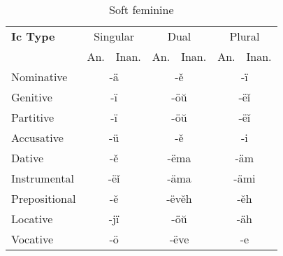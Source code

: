 \begin{table}[!htb]
	\caption{Soft feminine}
	\begin{tabular}{lllllll}
		\textbf{Ic Type}       
		& \multicolumn{2}{c}{Singular} 
		& \multicolumn{2}{c}{Dual} 
		& \multicolumn{2}{c}{Plural} \\
		& An.   & Inan.  & An.   & Inan.   & An.  & Inan. \\
		Nominative    & \multicolumn{2}{c}{-ä}      
		& \multicolumn{2}{c}{-ě}        
		& \multicolumn{2}{c}{-ï} \\
		Genitive      & \multicolumn{2}{c}{-ï}       
		& \multicolumn{2}{c}{-öŭ}      
		& \multicolumn{2}{c}{-ëǐ}   \\
		Partitive     & \multicolumn{2}{c}{-ï}       
		& \multicolumn{2}{c}{-öŭ}      
		& \multicolumn{2}{c}{-ëǐ} \\
		Accusative    & \multicolumn{2}{c}{-ü}       
		& \multicolumn{2}{c}{-ě}
		& \multicolumn{2}{c}{-i} \\
		Dative        & \multicolumn{2}{c}{-ě}       
		& \multicolumn{2}{c}{-ëma}     
		& \multicolumn{2}{c}{-äm} \\
		Instrumental  & \multicolumn{2}{c}{-ëǐ}     
		& \multicolumn{2}{c}{-äma}     
		& \multicolumn{2}{c}{-ämi} \\
		Prepositional & \multicolumn{2}{c}{-ě}       
		& \multicolumn{2}{c}{-ëvěh}     
		& \multicolumn{2}{c}{-ěh} \\
		Locative      & \multicolumn{2}{c}{-jï}      
		& \multicolumn{2}{c}{-öŭ}       
		& \multicolumn{2}{c}{-äh} \\ 
		Vocative      & \multicolumn{2}{c}{-ö}       
		& \multicolumn{2}{c}{-ëve}      
		& \multicolumn{2}{c}{-e}
	\end{tabular}
\end{table}

